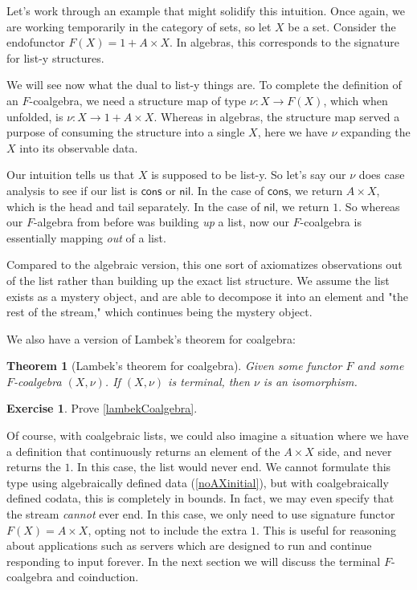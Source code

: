 \documentclass{article}
\theoremstyle{plain}
\newtheorem{theorem}{Theorem}
\theoremstyle{definition}
\newtheorem{exercise}{Exercise}
\begin{document}
Let's work through an example that might solidify this intuition. Once again, we are working temporarily in the category of sets, so let \ensuremath{X} be a set. Consider the endofunctor \ensuremath{F\left( X \right) = 1 + A \times X}. In algebras, this corresponds to the signature for list-y structures.

We will see now what the dual to list-y things are. To complete the definition of an \ensuremath{F}-coalgebra, we need a structure map of type \ensuremath{\nu : X \rightarrow F\left( X \right)}, which when unfolded, is \ensuremath{\nu : X \rightarrow 1 + A \times X}. Whereas in algebras, the structure map served a purpose of consuming the structure into a single \ensuremath{X}, here we have \ensuremath{\nu} expanding the \ensuremath{X} into its observable data.

Our intuition tells us that \ensuremath{X} is supposed to be list-y. So let's say our \ensuremath{\nu} does case analysis to see if our list is \ensuremath{\mathsf{cons}} or \ensuremath{\mathsf{nil}}. In the case of \ensuremath{\mathsf{cons}}, we return \ensuremath{A \times X}, which is the head and tail separately. In the case of \ensuremath{\mathsf{nil}}, we return \ensuremath{1}. So whereas our \ensuremath{F}-algebra from before was building \emph{up} a list, now our \ensuremath{F}-coalgebra is essentially mapping \emph{out} of a list.

Compared to the algebraic version, this one sort of axiomatizes observations out of the list rather than building up the exact list structure. We assume the list exists as a mystery object, and are able to decompose it into an element and "the rest of the stream," which continues being the mystery object.

We also have a version of Lambek's theorem for coalgebra:

\begin{theorem}[Lambek's theorem for coalgebra]
 Given some functor \ensuremath{F} and some \ensuremath{F}-coalgebra \ensuremath{\left( X, \nu \right)}. If \ensuremath{\left( X, \nu \right)} is terminal, then \ensuremath{\nu} is an isomorphism. 
\end{theorem}
\label{lambekCoalgebra} 

\begin{exercise}
Prove \ref{lambekCoalgebra}.
\end{exercise}


Of course, with coalgebraic lists, we could also imagine a situation where we have a definition that continuously returns an element of the \ensuremath{A \times X} side, and never returns the \ensuremath{1}. In this case, the list would never end. We cannot formulate this type using algebraically defined data (\ref{noAXinitial}), but with coalgebraically defined codata, this is completely in bounds. In fact, we may even specify that the stream \emph{cannot} ever end. In this case, we only need to use signature functor \ensuremath{F\left( X \right) = A \times X}, opting not to include the extra \ensuremath{1}. This is useful for reasoning about applications such as servers which are designed to run and continue responding to input forever. In the next section we will discuss the terminal \ensuremath{F}-coalgebra and coinduction.
\end{document}

